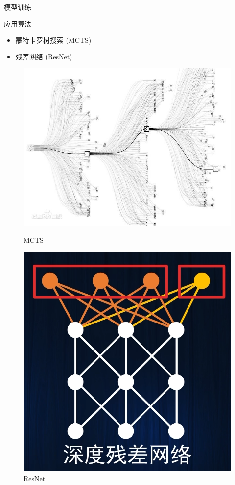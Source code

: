 \documentclass[compress]{beamer}
\begin{document}
\begin{frame}{模型训练}
  \begin{block}{应用算法}
    \begin{itemize}
      \setlength{\itemsep}{6pt}
      \item 蒙特卡罗树搜索 (MCTS)
      \item 残差网络 (ResNet)
    \end{itemize}
  \end{block}
  \begin{figure}[htbp]
    \centering
    \begin{minipage}[t]{0.4\textwidth}
      \centering
      \includegraphics[width=0.9\linewidth]{mc.jpg}
      \caption{MCTS}
    \end{minipage}
    \begin{minipage}[t]{0.4\textwidth}
      \centering
      \includegraphics[width=0.9\linewidth]{resnet.png}
      \caption{ResNet}
    \end{minipage}
  \end{figure}
\end{frame}
\end{document}
